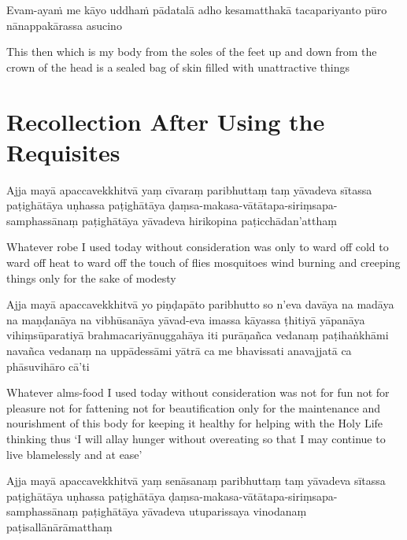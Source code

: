 Evam-ayaṁ me kāyo uddhaṁ pādatalā adho kesamatthakā tacapariyanto pūro nānappakārassa asucino

\begin{english}
  This then which is my body from the soles of the feet up and down from the crown of the head is a sealed bag of skin filled with unattractive things 
\end{english}


\clearpage

\section{Recollection After Using the Requisites}

\begin{leader}
\end{leader}


Ajja mayā apaccavekkhitvā yaṃ cīvaraṃ paribhuttaṃ taṃ yāvadeva sītassa
paṭighātāya uṇhassa paṭighātāya ḍaṃsa-makasa-vātātapa-siriṃsapa-samphassānaṃ
paṭighātāya yāvadeva hirikopina paṭicchādan'atthaṃ

\begin{english}
  Whatever robe I used today without consideration was only to ward off cold
  to ward off heat to ward off the touch of flies mosquitoes wind burning
  and creeping things only for the sake of modesty
\end{english}

Ajja mayā apaccavekkhitvā yo piṇḍapāto paribhutto so n'eva davāya na madāya
na maṇḍanāya na vibhūsanāya yāvad-eva imassa kāyassa ṭhitiyā yāpanāya
vihiṃsūparatiyā brahmacariyānuggahāya iti purāṇañca vedanaṃ paṭihaṅkhāmi
navañca vedanaṃ na uppādessāmi yātrā ca me bhavissati anavajjatā ca phāsuvihāro
cā'ti

\begin{english}
  Whatever alms-food I used today without consideration was not for fun not
  for pleasure not for fattening not for beautification only for the
  maintenance and nourishment of this body for keeping it healthy for helping
  with the Holy Life thinking thus `I will allay hunger without overeating so
  that I may continue to live blamelessly and at ease'
\end{english}

Ajja mayā apaccavekkhitvā yaṃ senāsanaṃ paribhuttaṃ taṃ yāvadeva sītassa
paṭighātāya uṇhassa paṭighātāya ḍaṃsa-makasa-vātātapa-siriṃsapa-samphassānaṃ
paṭighātāya yāvadeva utuparissaya vinodanaṃ paṭisallānārāmatthaṃ

